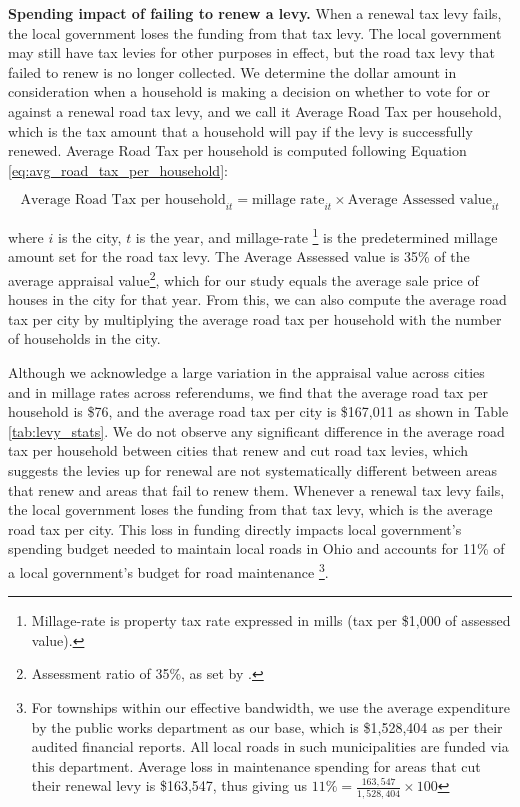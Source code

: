 {\bf Spending impact of failing to renew a levy.} When a renewal tax levy fails, the local government loses the funding from that tax levy. The local government may still have tax levies for other purposes in effect, but the road tax levy that failed to renew is no longer collected. We determine the dollar amount in consideration when a household is making a decision on whether to vote for or against a renewal road tax levy, and we call it Average Road Tax per household, which is the tax amount that a household will pay if the levy is successfully renewed. Average Road Tax per household is computed following Equation \ref{eq:avg_road_tax_per_household}:

\begin{equation}
\text{Average Road Tax per household}_{it} = \text{millage rate}_{it} \times \text{Average Assessed value}_{it}
\label{eq:avg_road_tax_per_household}
\end{equation}

\noindent where $i$ is the city, $t$ is the year, and millage-rate \footnote{Millage-rate is property tax rate expressed in mills (tax per \$1,000 of assessed value).} is the predetermined millage amount set for the road tax levy. The Average Assessed value is 35\% of the average appraisal value\footnote{Assessment ratio of 35\%, as set by \cite{OhioRealPropertyTax}.}, which for our study equals the average sale price of houses in the city for that year. From this, we can also compute the average road tax per city by multiplying the average road tax per household with the number of households in the city.

Although we acknowledge a large variation in the appraisal value across cities and in millage rates across referendums, we find that the average road tax per household is \$76, and the average road tax per city is \$167,011 as shown in Table \ref{tab:levy_stats}. We do not observe any significant difference in the average road tax per household between cities that renew and cut road tax levies, which suggests the levies up for renewal are not systematically different between areas that renew and areas that fail to renew them. Whenever a renewal tax levy fails, the local government loses the funding from that tax levy, which is the average road tax per city. This loss in funding directly impacts local government's spending budget needed to maintain local roads in Ohio and accounts for 11\% of a local government's budget for road maintenance \footnote{For townships within our effective bandwidth, we use the average expenditure by the public works department as our base, which is \$1,528,404 as per their audited financial reports. All local roads in such municipalities are funded via this department. Average loss in maintenance spending for areas that cut their renewal levy is \$163,547, thus giving us $11\% = \frac{163,547}{1,528,404} \times 100$ }.


